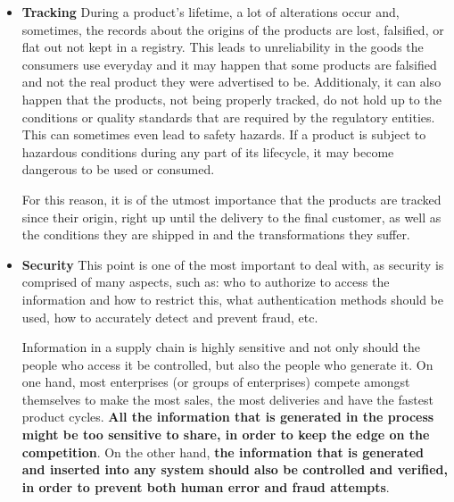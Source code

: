 \begin{itemize}
\item \textbf{Tracking}
During a product's lifetime, a lot of alterations occur and, sometimes, the records about the origins of the products are lost, falsified, or flat out not kept in a registry. This leads to unreliability in the goods the consumers use everyday and it may happen that some products are falsified and not the real product they were advertised to be. Additionaly, it can also happen that the products, not being properly tracked, do not hold up to the conditions or quality standards that are required by the regulatory entities. This can sometimes even lead to safety hazards. If a product is subject to hazardous conditions during any part of its lifecycle, it may become dangerous to be used or consumed.

For this reason, it is of the utmost importance that the products are tracked since their origin, right up until the delivery to the final customer, as well as the conditions they are shipped in and the transformations they suffer.

\item \textbf{Security}
This point is one of the most important to deal with, as security is comprised of many aspects, such as: who to authorize to access the information and how to restrict this, what authentication methods should be used, how to accurately detect and prevent fraud, etc. 

Information in a supply chain is highly sensitive and not only should the people who access it be controlled, but also the people who generate it.  On one hand, most enterprises (or groups of enterprises) compete amongst themselves to make the most sales, the most deliveries and have the fastest product cycles. \textbf{All the information that is generated in the process might be too sensitive to share, in order to keep the edge on the competition}.
On the other hand, \textbf{the information that is generated and inserted into any system should also be controlled and verified, in order to prevent both human error and fraud attempts}.


\end{itemize}

